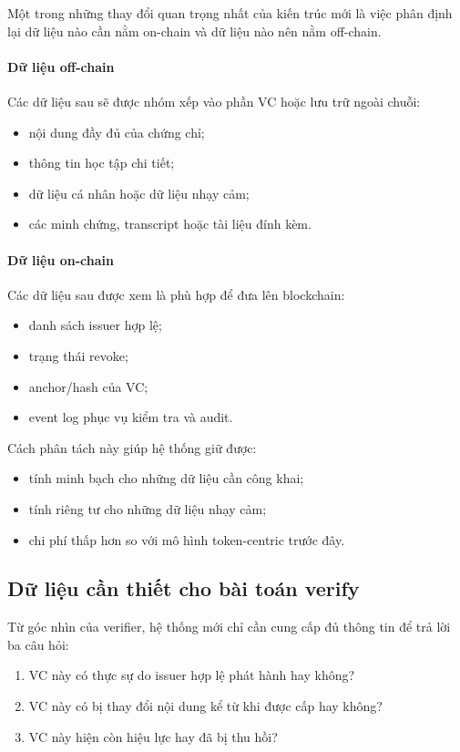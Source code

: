 Một trong những thay đổi quan trọng nhất của kiến trúc mới là việc phân định lại dữ liệu nào cần nằm on-chain và dữ liệu nào nên nằm off-chain.

\paragraph{Dữ liệu off-chain}
Các dữ liệu sau sẽ được nhóm xếp vào phần VC hoặc lưu trữ ngoài chuỗi:
\begin{itemize}
    \item nội dung đầy đủ của chứng chỉ;
    \item thông tin học tập chi tiết;
    \item dữ liệu cá nhân hoặc dữ liệu nhạy cảm;
    \item các minh chứng, transcript hoặc tài liệu đính kèm.
\end{itemize}

\paragraph{Dữ liệu on-chain}
Các dữ liệu sau được xem là phù hợp để đưa lên blockchain:
\begin{itemize}
    \item danh sách issuer hợp lệ;
    \item trạng thái revoke;
    \item anchor/hash của VC;
    \item event log phục vụ kiểm tra và audit.
\end{itemize}

Cách phân tách này giúp hệ thống giữ được:
\begin{itemize}
    \item tính minh bạch cho những dữ liệu cần công khai;
    \item tính riêng tư cho những dữ liệu nhạy cảm;
    \item chi phí thấp hơn so với mô hình token-centric trước đây.
\end{itemize}

\subsection{Dữ liệu cần thiết cho bài toán verify}

Từ góc nhìn của verifier, hệ thống mới chỉ cần cung cấp đủ thông tin để trả lời ba câu hỏi:
\begin{enumerate}
    \item VC này có thực sự do issuer hợp lệ phát hành hay không?
    \item VC này có bị thay đổi nội dung kể từ khi được cấp hay không?
    \item VC này hiện còn hiệu lực hay đã bị thu hồi?
\end{enumerate}

